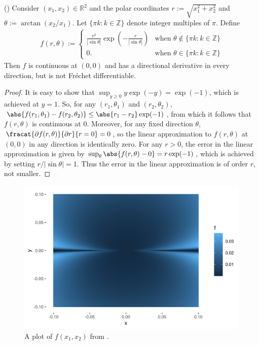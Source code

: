 \begin{ex}
%
(\citet[Example 1.9]{averbukh:1967:theory})
%
Consider $(x_1, x_2) \in \mathbb{R}^2$ and the polar coordinates $r :=
\sqrt{x_1^2 + x_2^2}$ and $\theta := \arctan(x_2 / x_1)$.  Let $\{\pi k: k \in
\mathbb{Z} \}$ denote integer multiples of $\pi$.  Define
%
\begin{align*}
%
f(r, \theta) := \begin{cases}
\frac{r^2}{| \sin \theta |} \exp\left( -\frac{r}{|\sin \theta|}\right)
    & \textrm{when } \theta \notin \{\pi k: k \in \mathbb{Z} \} \\
0. & \textrm{when } \theta \in \{\pi k: k \in \mathbb{Z} \}
%
\end{cases}
%
\end{align*}
%
Then $f$ is continuous at $(0, 0)$ and has a directional derivative in every
direction, but is not Fr{\'e}chet differentiable.
%
\begin{proof}
%
It is easy to show that $\sup_{y \ge 0} y \exp(-y) = \exp(-1)$, which is
achieved at $y=1$. So, for any $(r_1, \theta_1)$ and $(r_2, \theta_2)$,
$\abs{f(r_1, \theta_1) - f(r_2, \theta_2)} \le \abs{r_1 - r_2} \exp(-1)$, from
which it follows that $f(r, \theta)$ is continuous at $0$.  Moreover, for any
fixed direction $\theta$, $\fracat{\partial f(r, \theta)}{\partial r}{r=0} = 0$,
so the linear approximation to $f(r, \theta)$ at $(0, 0)$ in any direction is
identically zero.  For any $r > 0$, the error in the linear approximation is
given by $\sup_{\theta} \abs{f(r, \theta) - 0} = r \exp(-1)$, which is achieved
by setting $r / |\sin \theta| = 1$.  Thus the error in the linear approximation
is of order $r$, not smaller.
%
\end{proof}
%
\end{ex}
%
\begin{figure}[h!]

\includegraphics[width=0.980\linewidth,height=0.667\linewidth]{static_images/averbukh_example.png}
\caption{A plot of $f(x_1, x_2)$ from .}
\centering
\end{figure}
